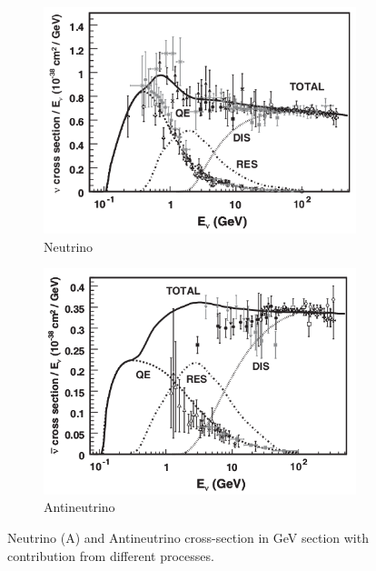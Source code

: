 \begin{figure}[H]
\centering
\begin{subfigure}[b]{0.45\textwidth}
    \centering
    \includegraphics[width=\linewidth]{figures/chapter6/neutrino_cross_mid.png}
\caption{Neutrino}
    \label{plot:cross_neu}
  \end{subfigure}
\begin{subfigure}[b]{0.45\textwidth}
    \centering
    \includegraphics[width=\linewidth]{figures/chapter6/antineutrino_cross_mid.png}
\caption{Antineutrino}
   \label{plot:cross_anti}
  \end{subfigure}
  \caption[neutrino interactions]{Neutrino (A) and Antineutrino cross-section in GeV section with contribution from different processes. \cite{RevModPhys.84.1307}}

    \label{plot:neutrino_cross_section}
\end{figure}

